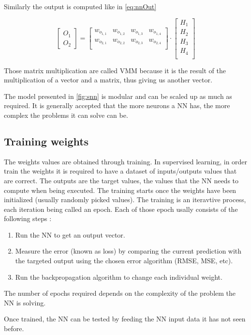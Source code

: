Similarly the output is computed like in \cref{eq:nnOut}

\begin{equation}\label{eq:nnOut}
  \begin{bmatrix}
    O_1\\ O_2
  \end{bmatrix}
  =
  \begin{bmatrix}
    w_o_{1,1} & w_o_{1,2} & w_o_{1,3} & w_o_{1,4}\\
    w_o_{2,1} & w_o_{2,2} & w_o_{2,3} & w_o_{2,4}\\
  \end{bmatrix}
  \cdot
  \begin{bmatrix}
    H_1\\ H_2\\ H_3\\ H_4\\
  \end{bmatrix}
\end{equation}

Those matrix multiplication are called \ac{VMM} because it is the result of the multiplication of a vector and a matrix, thus giving us another vector.

The model presented in \cref{fig:snn} is modular and can be scaled up as much as required. It is generally accepted that the more neurons a \ac{NN} has, the more complex the problems  it can solve can be.

\subsection{Training weights}

The weights values are obtained through training. In supervised learning, in order train the weights it is required to have a dataset of inputs/outputs values that are correct. The outputs are the target values, the values that the \ac{NN} needs to compute when being executed. The training starts once the weights have been initialized (usually randomly picked values). The training is an iteravtive process, each iteration being called an epoch. Each of those epoch usally consists of the following steps :

\begin{enumerate}
  \item Run the \ac{NN} to get an output vector.\label{step:restart}
  \item Measure the error (known as loss) by comparing the current prediction with the targeted output using the chosen error algorithm (\ac{RMSE}, \ac{MSE}, etc).
  \item Run the backpropagation algorithm to change each individual weight.
\end{enumerate}

The number of epochs required depends on the complexity of the problem the \ac{NN} is solving.

Once trained, the \ac{NN} can be tested by feeding the \ac{NN} input data it has not seen before.
